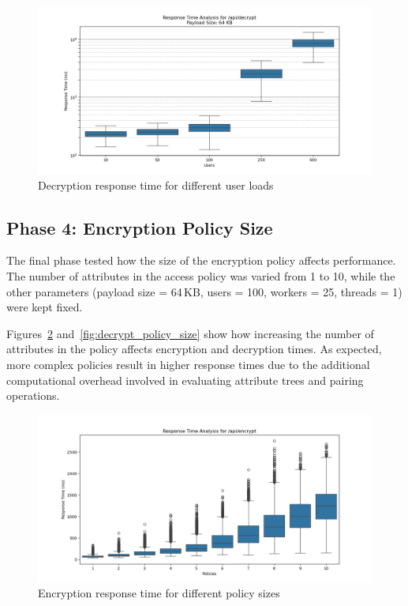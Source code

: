 \documentclass[cic,tc,english]{iiufrgs}
\begin{document}
            \begin{figure}
                \centering
                \includegraphics[width=\textwidth]{images/phase3/response_time_api_decrypt_64KB.png}
                \caption{Decryption response time for different user loads}
                \label{fig:decrypt_user_load}
            \end{figure}

            \subsection{Phase 4: Encryption Policy Size}
            \label{subsec:phase4_policysize}

            The final phase tested how the size of the encryption policy affects performance. The number of attributes in the access policy was varied from 1 to 10, while the other parameters (payload size = 64\,KB, users = 100, workers = 25, threads = 1) were kept fixed.

            Figures~\ref{fig:encrypt_policy_size} and~\ref{fig:decrypt_policy_size} show how increasing the number of attributes in the policy affects encryption and decryption times. As expected, more complex policies result in higher response times due to the additional computational overhead involved in evaluating attribute trees and pairing operations.

            \begin{figure}
                \centering
                \includegraphics[width=\textwidth]{images/phase4/response_time_api_encrypt.png}
                \caption{Encryption response time for different policy sizes}
                \label{fig:encrypt_policy_size}
            \end{figure}
\end{document}
